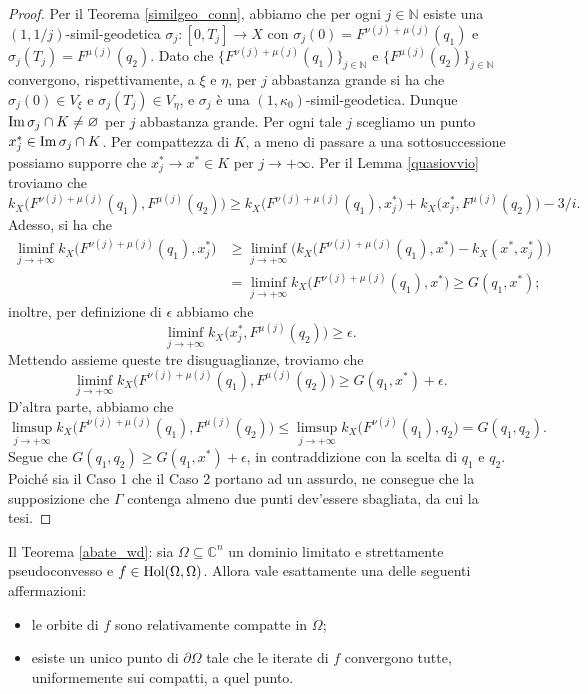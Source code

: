 \begin{proof}
    Per il Teorema \ref{similgeo_conn}, abbiamo che per ogni $j\in\mathbb{N}$ esiste una $(1,1/j)$-simil-geodetica $\sigma_j:[0,T_j]\longrightarrow X$ con $\sigma_j(0)=F^{\nu(j)+\mu(j)}(q_1)$ e $\sigma_j(T_j)=F^{\mu(j)}(q_2)$. Dato che $\{F^{\nu(j)+\mu(j)}(q_1)\}_{j\in\mathbb{N}}$ e $\{F^{\mu(j)}(q_2)\}_{j\in\mathbb{N}}$ convergono, rispettivamente, a $\xi$ e $\eta$, per $j$ abbastanza grande si ha che $\sigma_j(0)\in V_\xi$ e $\sigma_j(T_j)\in V_\eta$, e $\sigma_j$ è una $(1,\kappa_0)$-simil-geodetica. Dunque $\operatorname{Im}{\sigma_j}\cap K\not=\varnothing$ per $j$ abbastanza grande. Per ogni tale $j$ scegliamo un punto $x_j^*\in \operatorname{Im}{\sigma_j}\cap K$. Per compattezza di $K$, a meno di passare a una sottosuccessione possiamo supporre che $x_j^* \longrightarrow x^* \in K$ per $j\longrightarrow+\infty$. Per il Lemma \ref{quasiovvio} troviamo che
    $$k_X\big(F^{\nu(j)+\mu(j)}(q_1),F^{\mu(j)}(q_2)\big) \ge k_X\big(F^{\nu(j)+\mu(j)}(q_1),x_j^*\big)+k_X\big(x_j^*,F^{\mu(j)}(q_2)\big)-3/i.$$
    Adesso, si ha che
    \begin{align*}
        \liminf_{j\longrightarrow+\infty}k_X\big(F^{\nu(j)+\mu(j)}(q_1),x_j^*\big) &\ge \liminf_{j\longrightarrow+\infty} \Big(k_X\big(F^{\nu(j)+\mu(j)}(q_1),x^*\big)-k_X(x^*,x_j^*)\Big)\\
        &=\liminf_{j\longrightarrow+\infty}k_X\big(F^{\nu(j)+\mu(j)}(q_1),x^*\big) \ge G(q_1,x^*);
    \end{align*}
    inoltre, per definizione di $\epsilon$ abbiamo che
    $$\liminf_{j\longrightarrow+\infty}k_X\big(x_j^*,F^{\mu(j)}(q_2)\big) \ge \epsilon.$$
    Mettendo assieme queste tre disuguaglianze, troviamo che
    $$\liminf_{j\longrightarrow+\infty}k_X\big(F^{\nu(j)+\mu(j)}(q_1),F^{\mu(j)}(q_2)\big) \ge G(q_1,x^*)+\epsilon.$$
    D'altra parte, abbiamo che
    $$\limsup_{j\longrightarrow+\infty}k_X\big(F^{\nu(j)+\mu(j)}(q_1),F^{\mu(j)}(q_2)\big) \le \limsup_{j\longrightarrow+\infty}k_X\big(F^{\nu(j)}(q_1),q_2\big)=G(q_1,q_2).$$
    Segue che $G(q_1,q_2) \ge G(q_1,x^*)+\epsilon$, in contraddizione con la scelta di $q_1$ e $q_2$. \\

    Poiché sia il Caso 1 che il Caso 2 portano ad un assurdo, ne consegue che la supposizione che $\Gamma$ contenga almeno due punti dev'essere sbagliata, da cui la tesi.
\end{proof}

\begin{cor}
    Il Teorema \ref{abate_wd}: sia $\Omega \subseteq \mathbb{C}^n$ un dominio limitato e strettamente pseudoconvesso e $f \in \textnormal{Hol}(\Omega,\Omega)$. Allora vale esattamente una delle seguenti affermazioni:
    \begin{itemize}
        \item le orbite di $f$ sono relativamente compatte in $\Omega$;
        \item esiste un unico punto di $\partial\Omega$ tale che le iterate di $f$ convergono tutte, uniformemente sui compatti, a quel punto.
    \end{itemize}
\end{cor}

